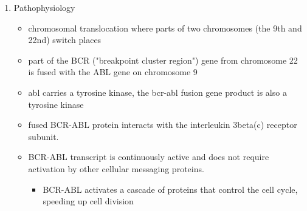 \documentclass[12pt]{scrartcl}
\begin{document}
\begin{enumerate}
\item Pathophysiology
\label{sec:orga3e9303}
\begin{itemize}
\item chromosomal translocation where parts of two chromosomes (the 9th
and 22nd) switch places
\item part of the BCR ("breakpoint cluster region") gene from chromosome
22 is fused with the ABL gene on chromosome 9
\item abl carries a tyrosine kinase, \therfore the bcr-abl fusion gene
product is also a tyrosine kinase
\item fused BCR-ABL protein interacts with the interleukin 3beta(c) receptor subunit.
\item BCR-ABL transcript is continuously active and does not require activation by other cellular messaging proteins.
\begin{itemize}
\item BCR-ABL activates a cascade of proteins that control the cell
cycle, speeding up cell division
\end{itemize}
\end{itemize}
\end{enumerate}
\end{document}
